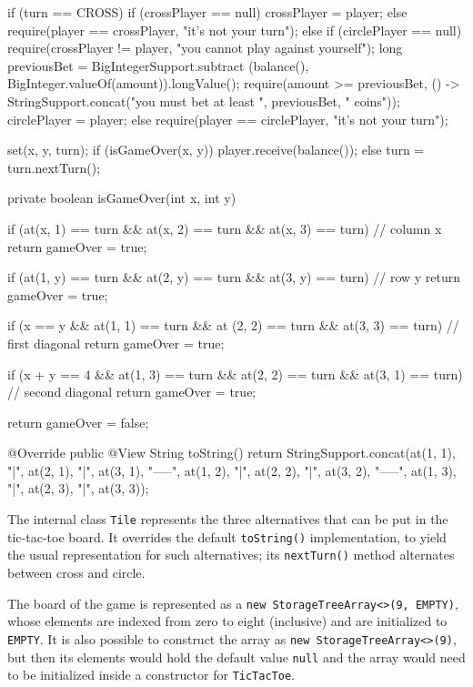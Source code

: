 \begin{codebox}
\begin{javalst}
{{    if (turn == CROSS)
      if (crossPlayer == null)
        crossPlayer = player;
      else
        require(player == crossPlayer, "it's not your turn");
    else
      if (circlePlayer == null) {
        require(crossPlayer != player, "you cannot play against yourself");
        long previousBet = BigIntegerSupport.subtract
          (balance(), BigInteger.valueOf(amount)).longValue();
        require(amount >= previousBet,
          () -> StringSupport.concat("you must bet at least ", previousBet, " coins"));
        circlePlayer = player;
      }
      else
        require(player == circlePlayer, "it's not your turn");

    set(x, y, turn);
    if (isGameOver(x, y))
      player.receive(balance());
    else
      turn = turn.nextTurn();
  }

  private boolean isGameOver(int x, int y) {
    if (at(x, 1) == turn && at(x, 2) == turn && at(x, 3) == turn) // column x
      return gameOver = true;

    if (at(1, y) == turn && at(2, y) == turn && at(3, y) == turn) // row y
      return gameOver = true;

    if (x == y && at(1, 1) == turn && at (2, 2) == turn && at(3, 3) == turn) // first diagonal
      return gameOver = true;

    if (x + y == 4 && at(1, 3) == turn && at(2, 2) == turn && at(3, 1) == turn) // second diagonal
      return gameOver = true;

    return gameOver = false;
  }

  @Override
  public @View String toString() {
    return StringSupport.concat(at(1, 1), "|", at(2, 1), "|", at(3, 1),
      "\n-----\n", at(1, 2), "|", at(2, 2), "|", at(3, 2),
      "\n-----\n", at(1, 3), "|", at(2, 3), "|", at(3, 3));
  }
}
\end{javalst}\end{codebox}

The internal class \texttt{Tile} represents the three alternatives that can be
put in the tic-tac-toe board. It overrides the default
\texttt{toString()} implementation, to yield the
usual representation for such alternatives; its \texttt{nextTurn()} method
alternates between cross and circle.

The board of the game is represented as a \texttt{new StorageTreeArray<>(9, EMPTY)}, whose
elements are indexed from zero to eight (inclusive) and are initialized to \texttt{EMPTY}.
It is also possible to construct the array as \texttt{new StorageTreeArray<>(9)}, but then
its elements would hold the default value \texttt{null} and the array would need to be initialized
inside a constructor for \texttt{TicTacToe}.


